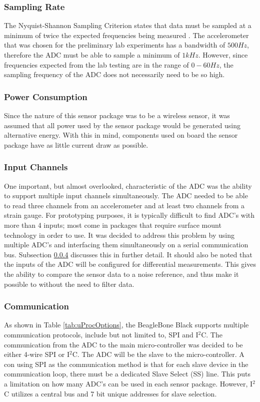 \subsubsection{Sampling Rate}		%
\label{sec:adc_fin}
\indent The Nyquist-Shannon Sampling Criterion states that data must be sampled at a minimum of twice the expected frequencies being measured
\cite{MusaJouaneh:2013}. The accelerometer that was chosen for the preliminary lab experiments has a bandwidth of $500 Hz$, therefore the ADC must be able
to sample a minimum of $1kHz$. However, since frequencies expected from the lab testing are in the range of $0-60Hz$, the sampling frequency of the ADC
does not necessarily need to be so high. %
%
\subsubsection{Power Consumption}
\label{sec:adc_power_cons.}
\indent Since the nature of this sensor package was to be a wireless sensor, it was assumed that all power used by the sensor package would be generated
using alternative energy. With this in mind, components used on board the sensor package have as little current draw as possible.
%
\subsubsection{Input Channels}
\label{sec:adc_in_ch_num}
\indent One important, but almost overlooked, characteristic of the ADC was the ability to support multiple input channels simultaneously. The ADC needed
to be able to read three channels from an accelerometer and at least two channels from a strain gauge. For prototyping purposes, it is typically difficult
to find ADC's with more than 4 inputs; most come in packages that require surface mount technology in order to use. It was decided to address this
problem by using multiple ADC's and interfacing them simultaneously on a serial communication bus. Subsection \ref{sec:adc_comm} discusses this in
further detail. It should also be noted that the inputs of the ADC will be configured for differential measurements. This gives the ability to compare
the sensor data to a noise reference, and thus make it possible to without the need to filter data. %

%
\subsubsection{Communication}
\label{sec:adc_comm}
\indent As shown in Table \ref{tab:uProcOptions}, the BeagleBone Black supports multiple communication protocols, include but not limited to, SPI and
I$^{2}$C. The communication from the ADC to the main micro-controller was decided to be either  4-wire SPI or I$^{2}$C. The ADC will be the slave to the
micro-controller. A con using SPI as the communication method is that for each slave device in the communication loop, there must be a dedicated Slave
Select (SS) line. This puts a limitation on how many ADC's can be used in each sensor package. However, I$^{2}$C utilizes a central bus and 7 bit unique
addresses for slave selection.

